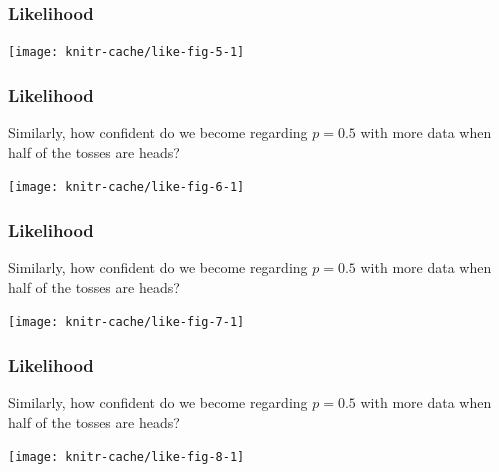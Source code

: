 
\begin{frame}
\frametitle{Likelihood}

\howlikely
\begin{center}
\begin{knitrout}
\color{fgcolor}
\texttt{[image: knitr-cache/like-fig-5-1]}

\end{knitrout}
\end{center}
\end{frame}


\begin{frame}
\frametitle{Likelihood}

Similarly, how confident do we become regarding $p=0.5$ with more data when half of the tosses are heads?

\begin{center}
\begin{knitrout}
\color{fgcolor}
\texttt{[image: knitr-cache/like-fig-6-1]}

\end{knitrout}
\end{center}
\end{frame}



\begin{frame}
\frametitle{Likelihood}

Similarly, how confident do we become regarding $p=0.5$ with more data when half of the tosses are heads?

\begin{center}
\begin{knitrout}
\color{fgcolor}
\texttt{[image: knitr-cache/like-fig-7-1]}

\end{knitrout}
\end{center}
\end{frame}



\begin{frame}
\frametitle{Likelihood}

Similarly, how confident do we become regarding $p=0.5$ with more data when half of the tosses are heads?

\begin{center}
\begin{knitrout}
\color{fgcolor}
\texttt{[image: knitr-cache/like-fig-8-1]}

\end{knitrout}
\end{center}
\end{frame}


